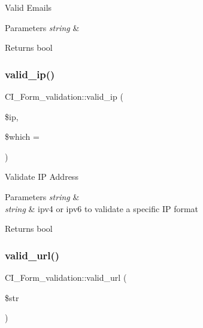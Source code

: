 Valid Emails


\begin{DoxyParams}{Parameters}
{\em string} & \\
\hline
\end{DoxyParams}
\begin{DoxyReturn}{Returns}
bool 
\end{DoxyReturn}
\mbox{\label{class_c_i___form__validation_a25df30cfb13139af0c64f1724b5a4e32}} 
\subsubsection{\texorpdfstring{valid\+\_\+ip()}{valid\_ip()}}
{\footnotesize\ttfamily C\+I\+\_\+\+Form\+\_\+validation\+::valid\+\_\+ip (\begin{DoxyParamCaption}\item[{}]{\$ip,  }\item[{}]{\$which = {\ttfamily \textquotesingle{}\textquotesingle{}} }\end{DoxyParamCaption})}

Validate IP Address


\begin{DoxyParams}{Parameters}
{\em string} & \\
\hline
{\em string} & \textquotesingle{}ipv4\textquotesingle{} or \textquotesingle{}ipv6\textquotesingle{} to validate a specific IP format \\
\hline
\end{DoxyParams}
\begin{DoxyReturn}{Returns}
bool 
\end{DoxyReturn}
\mbox{\label{class_c_i___form__validation_a6461c05af56d4969c1380421bd104041}} 
\subsubsection{\texorpdfstring{valid\+\_\+url()}{valid\_url()}}
{\footnotesize\ttfamily C\+I\+\_\+\+Form\+\_\+validation\+::valid\+\_\+url (\begin{DoxyParamCaption}\item[{}]{\$str }\end{DoxyParamCaption})}

